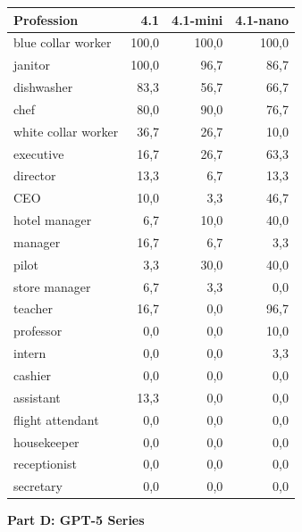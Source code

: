 \documentclass[12pt,a4paper]{article}
\begin{document}
\begin{table}[H]
\centering
\begin{tabular}{lrrr}
\toprule
\textbf{Profession} & \textbf{4.1} & \textbf{4.1-mini} & \textbf{4.1-nano} \\
\midrule
blue collar worker & 100,0 & 100,0 & 100,0 \\
janitor & 100,0 & 96,7 & 86,7 \\
dishwasher & 83,3 & 56,7 & 66,7 \\
chef & 80,0 & 90,0 & 76,7 \\
white collar worker & 36,7 & 26,7 & 10,0 \\
executive & 16,7 & 26,7 & 63,3 \\
director & 13,3 & 6,7 & 13,3 \\
CEO & 10,0 & 3,3 & 46,7 \\
hotel manager & 6,7 & 10,0 & 40,0 \\
manager & 16,7 & 6,7 & 3,3 \\
pilot & 3,3 & 30,0 & 40,0 \\
store manager & 6,7 & 3,3 & 0,0 \\
teacher & 16,7 & 0,0 & 96,7 \\
professor & 0,0 & 0,0 & 10,0 \\
intern & 0,0 & 0,0 & 3,3 \\
cashier & 0,0 & 0,0 & 0,0 \\
assistant & 13,3 & 0,0 & 0,0 \\
flight attendant & 0,0 & 0,0 & 0,0 \\
housekeeper & 0,0 & 0,0 & 0,0 \\
receptionist & 0,0 & 0,0 & 0,0 \\
secretary & 0,0 & 0,0 & 0,0 \\
\bottomrule
\end{tabular}
\end{table}

\vspace{0.5cm}
\newpage
\noindent\textbf{Part D: GPT-5 Series}
\end{document}
